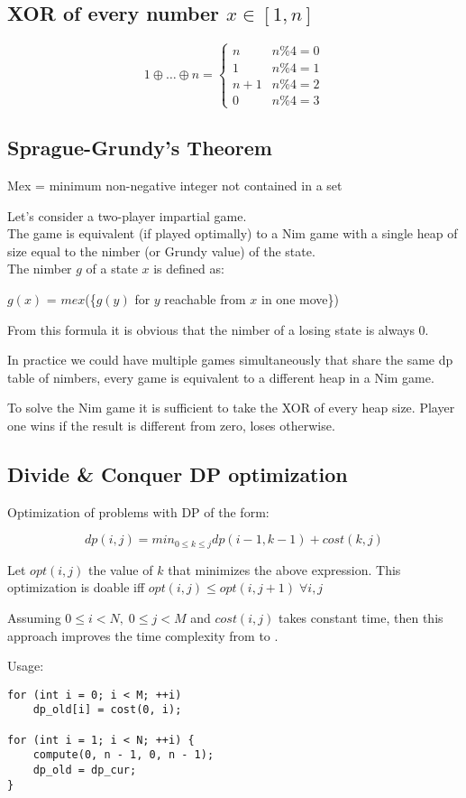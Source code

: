 \subsection{XOR of every number $x \in [1, n]$}
\[1 \oplus \ldots \oplus n =
	\begin{cases}
		n & n \% 4 = 0 \\
		1 & n \% 4 = 1 \\
		n + 1 & n \% 4 = 2 \\
		0 & n \% 4 = 3
	\end{cases}
\]


\subsection{Sprague-Grundy's Theorem}
Mex = minimum non-negative integer not contained in a set

Let's consider a two-player impartial game. \\
The game is equivalent (if played optimally) to a Nim game with a single
heap of size equal to the nimber (or Grundy value) of the state. \\
The nimber $g$ of a state $x$ is defined as:

$g(x)$ = $mex$(\{$g(y)$ for $y$ reachable from $x$ in one move\})

From this formula it is obvious that the nimber of a losing state is always 0.

In practice we could have multiple games simultaneously that share the same
dp table of nimbers, every game is equivalent to a different heap in a Nim game.

To solve the Nim game it is sufficient to take the XOR of every heap size.
Player one wins if the result is different from zero, loses otherwise.


\subsection{Divide \& Conquer DP optimization}
Optimization of problems with DP of the form:

\[dp(i, j) = min_{0 \leq k \leq j}dp(i - 1, k - 1) + cost(k, j)\]

Let $opt(i, j)$ the value of $k$ that minimizes the above expression.
This optimization is doable iff $opt(i, j) \leq opt(i, j + 1) \; \forall i, j$

Assuming $0 \leq i < N, \; 0 \leq j < M$ and $cost(i, j)$ takes constant time,
then this approach improves the time complexity from  to .

Usage:
\begin{lstlisting}
for (int i = 0; i < M; ++i)
	dp_old[i] = cost(0, i);

for (int i = 1; i < N; ++i) {
	compute(0, n - 1, 0, n - 1);
	dp_old = dp_cur;
}
\end{lstlisting}


